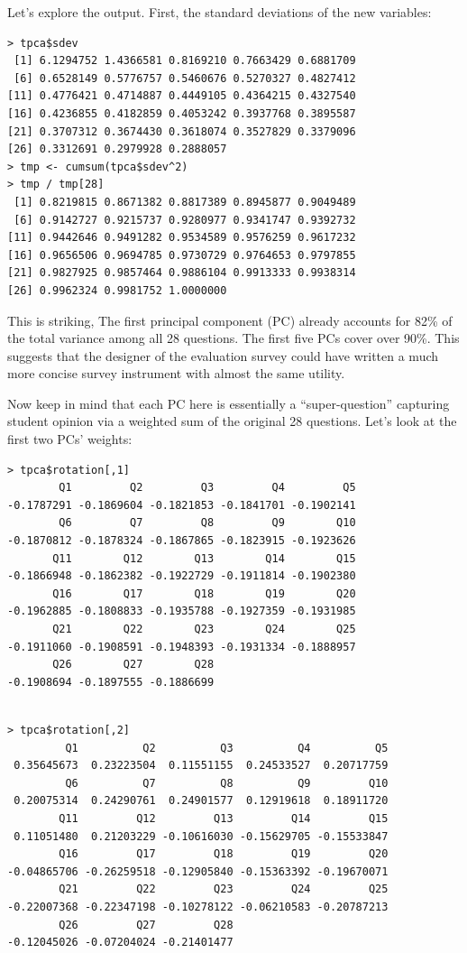 Let's explore the output.  First, the standard deviations of the new
variables:

\begin{lstlisting}
> tpca$sdev
 [1] 6.1294752 1.4366581 0.8169210 0.7663429 0.6881709
 [6] 0.6528149 0.5776757 0.5460676 0.5270327 0.4827412
[11] 0.4776421 0.4714887 0.4449105 0.4364215 0.4327540
[16] 0.4236855 0.4182859 0.4053242 0.3937768 0.3895587
[21] 0.3707312 0.3674430 0.3618074 0.3527829 0.3379096
[26] 0.3312691 0.2979928 0.2888057
> tmp <- cumsum(tpca$sdev^2)
> tmp / tmp[28]
 [1] 0.8219815 0.8671382 0.8817389 0.8945877 0.9049489
 [6] 0.9142727 0.9215737 0.9280977 0.9341747 0.9392732
[11] 0.9442646 0.9491282 0.9534589 0.9576259 0.9617232
[16] 0.9656506 0.9694785 0.9730729 0.9764653 0.9797855
[21] 0.9827925 0.9857464 0.9886104 0.9913333 0.9938314
[26] 0.9962324 0.9981752 1.0000000
\end{lstlisting}

This is striking,  The first principal component (PC) already accounts
for 82\% of the total variance among all 28 questions.  The first five
PCs cover over 90\%.  This suggests that the designer of the evaluation
survey could have written a much more concise survey instrument with
almost the same utility.

Now keep in mind that each PC here is essentially a ``super-question''
capturing student opinion via a weighted sum of the original 28
questions.  Let's look at the first two PCs' weights:

\begin{lstlisting}
> tpca$rotation[,1]
        Q1         Q2         Q3         Q4         Q5 
-0.1787291 -0.1869604 -0.1821853 -0.1841701 -0.1902141 
        Q6         Q7         Q8         Q9        Q10 
-0.1870812 -0.1878324 -0.1867865 -0.1823915 -0.1923626 
       Q11        Q12        Q13        Q14        Q15 
-0.1866948 -0.1862382 -0.1922729 -0.1911814 -0.1902380 
       Q16        Q17        Q18        Q19        Q20 
-0.1962885 -0.1808833 -0.1935788 -0.1927359 -0.1931985 
       Q21        Q22        Q23        Q24        Q25 
-0.1911060 -0.1908591 -0.1948393 -0.1931334 -0.1888957 
       Q26        Q27        Q28 
-0.1908694 -0.1897555 -0.1886699 
\end{lstlisting}

\begin{lstlisting}

> tpca$rotation[,2]
         Q1          Q2          Q3          Q4          Q5 
 0.35645673  0.23223504  0.11551155  0.24533527  0.20717759 
         Q6          Q7          Q8          Q9         Q10 
 0.20075314  0.24290761  0.24901577  0.12919618  0.18911720 
        Q11         Q12         Q13         Q14         Q15 
 0.11051480  0.21203229 -0.10616030 -0.15629705 -0.15533847 
        Q16         Q17         Q18         Q19         Q20 
-0.04865706 -0.26259518 -0.12905840 -0.15363392 -0.19670071 
        Q21         Q22         Q23         Q24         Q25 
-0.22007368 -0.22347198 -0.10278122 -0.06210583 -0.20787213 
        Q26         Q27         Q28 
-0.12045026 -0.07204024 -0.21401477 
\end{lstlisting}

